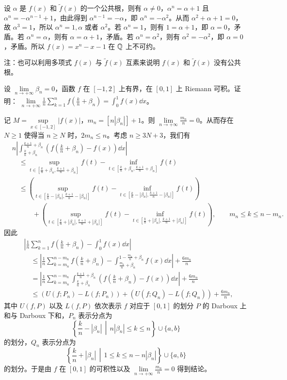 \begin{solution}
设 $\alpha$ 是 $f(x)$ 和 $\widetilde f(x)$ 的一个公共根，则有 $\alpha\ne0$，$\alpha^n=\alpha+1$ 且 $\alpha^n=-\alpha^{n-1}+1$，由此得到 $\alpha^{n-1}=-\alpha$，即 $\alpha^n=-\alpha^2$。从而 $\alpha^2+\alpha+1=0$，故 $\alpha^3=1$，所以 $\alpha^n=1,\alpha$ 或者 $\alpha^2$。若 $\alpha^n=1$，则有 $1=\alpha+1$，即 $\alpha=0$，矛盾。若 $\alpha^n=\alpha$，则有 $\alpha=\alpha+1$，矛盾。若 $\alpha^n=\alpha^2$，则有 $\alpha^2=-\alpha^2$，即 $\alpha=0$，矛盾。所以 $f(x)=x^n-x-1$ 在 $\mathbb{Q}$ 上不可约。

注：也可以利用多项式 $f(x)$ 与 $\widetilde f(x)$ 互素来说明 $f(x)$ 和 $\widetilde f(x)$ 没有公共根。
\end{solution}

设 $\lim\limits_{n\to+\infty}\beta_n=0$，函数 $f$ 在 $[-1,2]$ 上有界，在 $[0,1]$ 上 Riemann 可积。证明：
$\lim\limits_{n\to+\infty}\frac{1}{n}\sum\limits_{k=1}^{n}f\left(\frac{k}{n}+\beta_n\right)=\int_0^1f(x)\dd x$。
\begin{solution}
记 $M=\sup\limits_{x\in[-1,2]}|f(x)|$，$m_n=[n|\beta_n|]+1$。则 $\lim\limits_{n\to+\infty}\frac{m_n}{n}=0$。从而存在 $N\ge1$ 使得当 $n\ge N$ 时，$2m_n\le n$。考虑 $n\ge3N+3$，我们有
\begin{align*}
&n\left|\int_{\frac{k}{n}+\beta_n}^{\frac{k+1}{n}+\beta_n}\left(f\left(\frac{k}{n}+\beta_n\right)-f(x)\right)\dd x\right|\\
&\quad\le\sup_{t\in\left[\frac{k}{n}+\beta_n,\frac{k+1}{n}+\beta_n\right]}f(t)-\inf_{t\in\left[\frac{k}{n}+\beta_n,\frac{k+1}{n}+\beta_n\right]}f(t)\\
&\quad\le\left(\sup_{t\in\left[\frac{k}{n}-|\beta_n|,\frac{k+1}{n}-|\beta_n|\right]}f(t)-\inf_{t\in\left[\frac{k}{n}-|\beta_n|,\frac{k+1}{n}-|\beta_n|\right]}f(t)\right)\\
&\quad\qquad+\left(\sup_{t\in\left[\frac{k}{n}+|\beta_n|,\frac{k+1}{n}+|\beta_n|\right]}f(t)-\inf_{t\in\left[\frac{k}{n}+|\beta_n|,\frac{k+1}{n}+|\beta_n|\right]}f(t)\right),\qquad m_n\le k\le n-m_n.
\end{align*}
因此
\begin{align*}
&\left|\frac{1}{n}\sum_{k=1}^{n}f\left(\frac{k}{n}+\beta_n\right)-\int_0^1f(x)\dd x\right|\\
&\quad\le\left|\frac{1}{n}\sum_{k=m_n}^{n-m_n}f\left(\frac{k}{n}+\beta_n\right)-\int_{\frac{m_n}{n}+\beta_n}^{1-\frac{m_n}{n}+\beta_n}f(x)\dd x\right|+\frac{6m_n}{n}\\
&\quad=\left|\frac{1}{n}\sum_{k=m_n}^{n-m_n}\int_{\frac{k}{n}+\beta_n}^{\frac{k+1}{n}+\beta_n}\left(f\left(\frac{k}{n}+\beta_n\right)-f(x)\right)\dd x\right|+\frac{6m_n}{n}\\
&\quad\le\left(U(f;P_n)-L(f;P_n)\right)+\left(U(f;Q_n)-L(f;Q_n)\right)+\frac{6m_n}{n},
\end{align*}
其中 $U(f,P)$ 以及 $L(f,P)$ 依次表示 $f$ 对应于 $[0,1]$ 的划分 $P$ 的 Darboux 上和与 Darboux 下和，$P_n$ 表示分点为
\[
\left\{\frac{k}{n}-|\beta_n|\,\middle|\,n|\beta_n|\le k\le n\right\}\cup\{a,b\}
\]
的划分，$Q_n$ 表示分点为
\[
\left\{\frac{k}{n}+|\beta_n|\,\middle|\,1\le k\le n-n|\beta_n|\right\}\cup\{a,b\}
\]
的划分。于是由 $f$ 在 $[0,1]$ 的可积性以及 $\lim\limits_{n\to+\infty}\frac{m_n}{n}=0$ 得到结论。
\end{solution}

